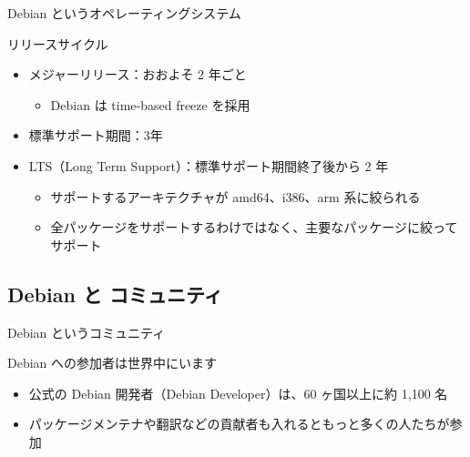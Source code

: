 \begin{frame}{Debian というオペレーティングシステム}

リリースサイクル

\begin{itemize}
\item メジャーリリース：おおよそ 2 年ごと
  \begin{itemize}
  \item Debian は time-based freeze を採用
  \end{itemize}
\item 標準サポート期間：3年
\item LTS（Long Term Support）：標準サポート期間終了後から 2 年
  \begin{itemize}
  \item サポートするアーキテクチャが amd64、i386、arm 系に絞られる
  \item 全パッケージをサポートするわけではなく、主要なパッケージに絞ってサポート
  \end{itemize}
\end{itemize}

\end{frame}


\subsection{Debian と コミュニティ}

\begin{frame}{Debian というコミュニティ}

Debian への参加者は世界中にいます

\begin{itemize}
\item 公式の Debian 開発者（Debian Developer）は、60 ヶ国以上に約 1,100 名
\item パッケージメンテナや翻訳などの貢献者も入れるともっと多くの人たちが参加
\end{itemize}
  
\end{frame}


